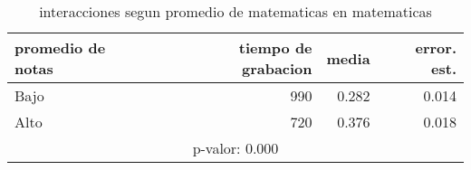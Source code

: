 \documentclass[spanish]{article}
\begin{document}
\begin{table}[h!]
\begin{center}
\begin{tabular}{|l|r|r|r|}
\hline
promedio de notas & tiempo de grabacion & media          & error. est.    \\ \hline
Bajo              &                 990 &          0.282 &           0.014\\ \hline
Alto              &                 720 &          0.376 &           0.018\\ \hline
\multicolumn{4}{|c|}{p-valor: 0.000} \\ \hline
\end{tabular}
\caption{interacciones segun promedio de matematicas en matematicas}
\end{center}
\end{table}
\end{document}
